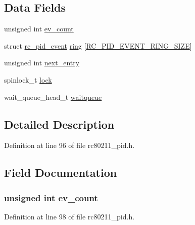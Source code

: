 \subsection*{Data Fields}
\begin{DoxyCompactItemize}
\item 
unsigned int \hyperlink{structrc__pid__event__buffer_aafefaa6538709caeb21b4566c91f8936}{ev\-\_\-count}
\item 
struct \hyperlink{structrc__pid__event}{rc\-\_\-pid\-\_\-event} \hyperlink{structrc__pid__event__buffer_ac15c562561ecad08ac70a1b809622c66}{ring} \mbox{[}\hyperlink{rc80211__pid_8h_afa197c57381c9b4287a15f41f0700f75}{R\-C\-\_\-\-P\-I\-D\-\_\-\-E\-V\-E\-N\-T\-\_\-\-R\-I\-N\-G\-\_\-\-S\-I\-Z\-E}\mbox{]}
\item 
unsigned int \hyperlink{structrc__pid__event__buffer_a504ce2058dfc4cdd4cf89d9e63c34b89}{next\-\_\-entry}
\item 
spinlock\-\_\-t \hyperlink{structrc__pid__event__buffer_a79cda015c79ff2b4c1444e3070f0bb5d}{lock}
\item 
wait\-\_\-queue\-\_\-head\-\_\-t \hyperlink{structrc__pid__event__buffer_a24489217320b81c842b7d32aa13ff863}{waitqueue}
\end{DoxyCompactItemize}


\subsection{Detailed Description}


Definition at line 96 of file rc80211\-\_\-pid.\-h.



\subsection{Field Documentation}
\hypertarget{structrc__pid__event__buffer_aafefaa6538709caeb21b4566c91f8936}{
\subsubsection[{ev\-\_\-count}]{\setlength{\rightskip}{0pt plus 5cm}unsigned int ev\-\_\-count}}\label{structrc__pid__event__buffer_aafefaa6538709caeb21b4566c91f8936}


Definition at line 98 of file rc80211\-\_\-pid.\-h.

